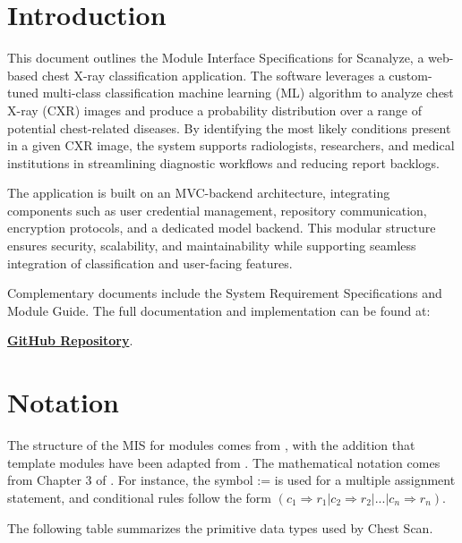 \documentclass[12pt, titlepage]{article}
\begin{document}
\newpage

\tableofcontents

\newpage


\section{Introduction}

This document outlines the Module Interface Specifications for Scanalyze, a web-based chest X-ray classification application. The software leverages a custom-tuned multi-class classification machine learning (ML) algorithm to analyze chest X-ray (CXR) images and produce a probability distribution over a range of potential chest-related diseases. By identifying the most likely conditions present in a given CXR image, the system supports radiologists, researchers, and medical institutions in streamlining diagnostic workflows and reducing report backlogs.

The application is built on an MVC-backend architecture, integrating components such as user credential management, repository communication, encryption protocols, and a dedicated model backend. This modular structure ensures security, scalability, and maintainability while supporting seamless integration of classification and user-facing features.

Complementary documents include the System Requirement Specifications and Module Guide. The full documentation and implementation can be found at:

\href{https://github.com/harrisonchiu/xray/tree/main}{\textbf{GitHub Repository}}.


\section{Notation}

The structure of the MIS for modules comes from \citet{HoffmanAndStrooper1995}, with the addition that template modules have been adapted from \cite{GhezziEtAl2003}. The mathematical notation comes from Chapter 3 of \citet{HoffmanAndStrooper1995}. For instance, the symbol := is used for a multiple assignment statement, and conditional rules follow the form $(c_1 \Rightarrow r_1 | c_2 \Rightarrow r_2 | ... | c_n \Rightarrow r_n )$.

The following table summarizes the primitive data types used by Chest Scan.
\end{document}
